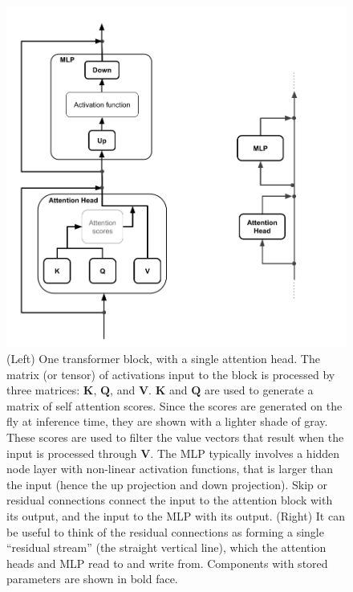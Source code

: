 \begin{figure}[ht]
\centering
\includegraphics[scale=.25]{./images/transformerBlockResidualStream.png}
\caption[Jeff Yoshimi and Pierre Beckman, with consultation from Tim Meyer.]{(Left) One transformer
block, with a single attention head. The matrix (or tensor) of activations input to
the block is processed by three matrices: $\textbf{K}$, $\textbf{Q}$, and
$\textbf{V}$.  $\textbf{K}$ and $\textbf{Q}$ are used to generate a
matrix of self attention scores. Since the scores are generated on the fly at inference time, they are shown with a lighter shade of gray. These scores are used to filter the value vectors that result when the input is processed through $\textbf{V}$. The MLP
typically involves a hidden node layer with non-linear activation functions, that is larger than the input (hence the up
projection and down projection). Skip or residual connections connect the input to the attention block with its output, and the input to the MLP with its output. (Right) It can be useful to think of the residual connections as forming a single ``residual stream'' (the straight vertical line), which the attention heads and MLP read to and write from. Components with stored parameters are shown in bold face.}
\label{transformerBlockSimple}
\end{figure}

